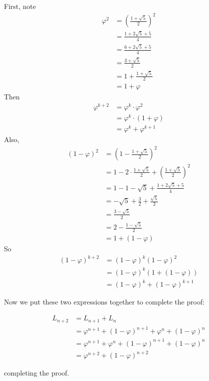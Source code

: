 \documentclass[paper=a4, fontsize=11pt]{scrartcl} %
\numberwithin{equation}{section} %
\numberwithin{figure}{section} %
\numberwithin{table}{section} %
\begin{document}
First, note
\begin{align*}
\varphi^2 &= \left(\frac{1 + \sqrt{5}}{2}\right)^2 \\
	&= \frac{1 + 2\sqrt{5}+5}{4} \\
	&= \frac{6 + 2\sqrt{5}+5}{4} \\
	&= \frac{3 + \sqrt{5}}{2} \\
	&= 1 + \frac{1 + \sqrt{5}}{2} \\
	&= 1 + \varphi
\end{align*}
Then
\begin{align*}
\varphi^{k+2} &= \varphi^k \cdot \varphi^2 \\
	&= \varphi^k \cdot (1 + \varphi) \\
	&= \varphi^k + \varphi^{k+1}
\end{align*}
Also, 
\begin{align*}
(1 - \varphi)^2 &= \left(1 - \frac{1 + \sqrt{5}}{2}\right)^2 \\
	&= 1 - 2\cdot \frac{1 + \sqrt{5}}{2} + \left(\frac{1 + \sqrt{5}}{2}\right)^2 \\
	&= 1 -1 - \sqrt{5} + \frac{1 + 2\sqrt{5}+5}{4} \\
	&= - \sqrt{5} + \frac{3}{2} + \frac{\sqrt{5}}{2} \\
	&= \frac{3- \sqrt{5}}{2} \\
	&= 2 - \frac{1- \sqrt{5}}{2} \\
	&= 1 + (1 - \varphi)
\end{align*}
So
\begin{align*}
(1 - \varphi)^{k+2} &= (1 - \varphi)^k (1 - \varphi)^2 \\
	&= (1 - \varphi)^k \left(1 + (1 - \varphi)\right) \\
	&= (1 - \varphi)^k +  (1 - \varphi)^{k+1}
\end{align*}

Now we put these two expressions together to complete the proof:

\begin{align*}
L_{n+2} &= L_{n+1} + L_{n} \\
	&= \varphi^{n+1} + (1 - \varphi)^{n+1} +  \varphi^{n} + (1 - \varphi)^{n}\\
	&= \varphi^{n+1}  +  \varphi^{n} + (1 - \varphi)^{n+1} + (1 - \varphi)^{n}\\
	&= \varphi^{n+2} + (1 - \varphi)^{n+2}
\end{align*}

completing the proof.

\end{document}
